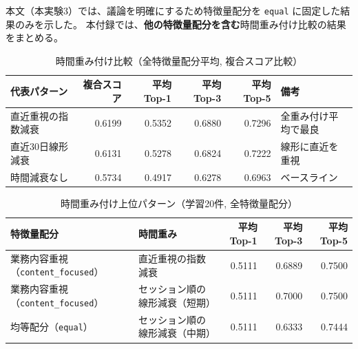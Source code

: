 
本文（本実験3）では、議論を明確にするため特徴量配分を \texttt{equal} に固定した結果のみを示した。
本付録では、\textbf{他の特徴量配分を含む}時間重み付け比較の結果をまとめる。

\begin{table}[htbp]
\centering
\caption{時間重み付け比較（全特徴量配分平均, 複合スコア比較）}
\scriptsize
\begin{tabular}{l r r r r l}
\hline
代表パターン & 複合スコア & 平均Top-1 & 平均Top-3 & 平均Top-5 & 備考 \\
\hline
直近重視の指数減衰 & 0.6199 & 0.5352 & 0.6880 & 0.7296 & 全重み付け平均で最良 \\
直近30日線形減衰 & 0.6131 & 0.5278 & 0.6824 & 0.7222 & 線形に直近を重視 \\
時間減衰なし & 0.5734 & 0.4917 & 0.6278 & 0.6963 & ベースライン \\
\hline
\end{tabular}
\end{table}

\begin{table}[htbp]
\centering
\caption{時間重み付け上位パターン（学習20件, 全特徴量配分）}
\scriptsize
\begin{tabularx}{\linewidth}{X X r r r}
\hline
特徴量配分 & 時間重み & 平均Top-1 & 平均Top-3 & 平均Top-5 \\
\hline
業務内容重視（\texttt{content\_focused}） & 直近重視の指数減衰 & 0.5111 & 0.6889 & 0.7500 \\
業務内容重視（\texttt{content\_focused}） & セッション順の線形減衰（短期） & 0.5111 & 0.7000 & 0.7500 \\
均等配分（\texttt{equal}） & セッション順の線形減衰（中期） & 0.5111 & 0.6333 & 0.7444 \\
\hline
\end{tabularx}
\end{table}

\begin{table}[htbp]
\centering
\caption{時間重み付け上位パターン（学習20件, 全特徴量配分）}
\scriptsize

\end{table}

\begin{table}[htbp]
\centering
\caption{時間重み付け上位パターン（学習30件, 全特徴量配分）}
\scriptsize

\end{table}

